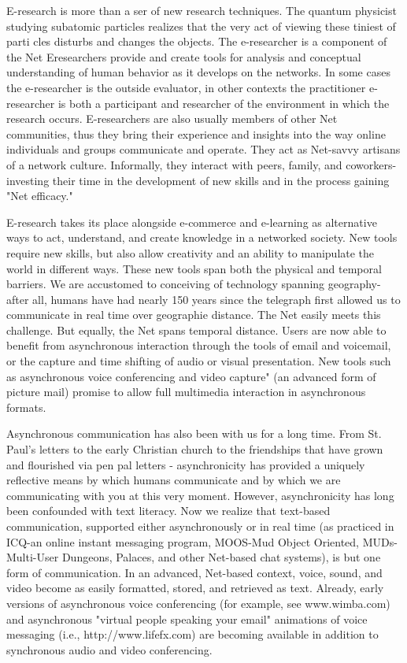 \documentclass[a4, 11pt]{article}
\begin{document}
E-research is more than a ser of new research techniques. The quantum physicist studying subatomic particles realizes that the very act of viewing these tiniest of parti cles disturbs and changes the objects. The e-researcher is a component of the Net Eresearchers provide and create tools for analysis and conceptual understanding of human behavior as it develops on the networks. In some cases the e-researcher is the outside evaluator, in other contexts the practitioner e-researcher is both a participant and researcher of the environment in which the research occurs. E-researchers are also usually members of other Net communities, thus they bring their experience and insights into the way online individuals and groups communicate and operate. They act as Net-savvy artisans of a network culture. Informally, they interact with peers, family, and coworkers-investing their time in the development of new skills and in the process gaining "Net efficacy."

E-research takes its place alongside e-commerce and e-learning as alternative ways to act, understand, and create knowledge in a networked society. New tools require new skills, but also allow creativity and an ability to manipulate the world in different ways. These new tools span both the physical and temporal barriers. We are accustomed to conceiving of technology spanning geography-after all, humans have had nearly 150 years since the telegraph first allowed us to communicate in real time over geographie distance. The Net easily meets this challenge. But equally, the Net spans temporal distance. Users are now able to benefit from asynchronous interaction through the tools of email and voicemail, or the capture and time shifting of audio or visual presentation. New tools such as asynchronous voice conferencing and video capture" (an advanced form of picture mail) promise to allow full multimedia interaction in asynchronous formats.

Asynchronous communication has also been with us for a long time. From St. Paul's letters to the early Christian church to the friendships that have grown and flourished via pen pal letters - asynchronicity has provided a uniquely reflective means by which humans communicate and by which we are communicating with you at this very moment. However, asynchronicity has long been confounded with text literacy. Now we realize that text-based communication, supported either asynchronously or in real time (as practiced in ICQ-an online instant messaging program, MOOS-Mud Object Oriented, MUDs-Multi-User Dungeons, Palaces, and other Net-based chat systems), is but one form of communication. In an advanced, Net-based context, voice, sound, and video become as easily formatted, stored, and retrieved as text. Already, early versions of asynchronous voice conferencing (for example, see www.wimba.com) and asynchronous "virtual people speaking your email" animations of voice messaging (i.e., http://www.lifefx.com) are becoming available in addition to synchronous audio and video conferencing.
\end{document}

